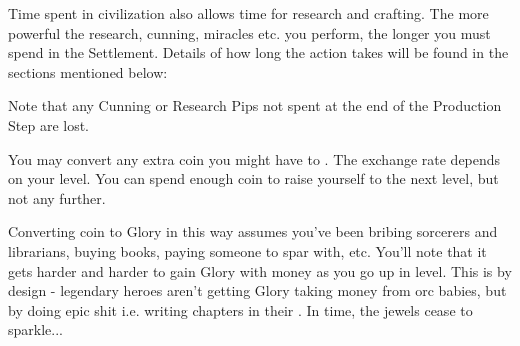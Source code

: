 \begin{multicols*}{2}
\cbreak


Time spent in civilization also allows time for research and crafting. The more powerful the research, cunning, miracles etc. you perform, the longer you must spend in the Settlement. Details of how long the action takes will be found in the sections mentioned below:


Note that any Cunning or Research Pips not spent at the end of the Production Step are lost.



You may convert any extra coin you might have to . The exchange rate depends on your level. You can spend enough coin to raise yourself to the next level, but not any further.

Converting coin to Glory in this way assumes you've been bribing sorcerers and librarians, buying books, paying someone to spar with, etc. You’ll note that it gets harder and harder to gain Glory with money as you go up in level. This is by design - legendary heroes aren’t getting Glory taking money from orc babies, but by doing epic shit i.e. writing chapters in their . In time, the jewels cease to sparkle...

\end{multicols*}

